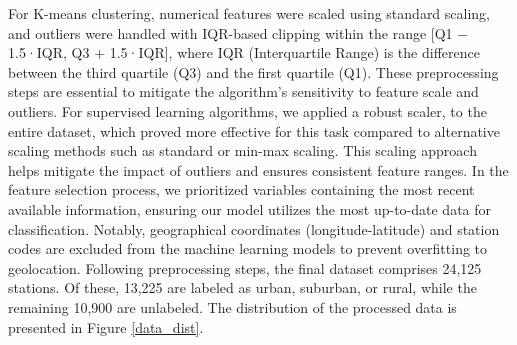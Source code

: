 \documentclass[gmd, manuscript]{copernicus}
\begin{document}
For K-means clustering, numerical features were scaled using standard scaling, and outliers were handled with IQR-based clipping within the range [Q1 − 1.5·IQR, Q3 + 1.5·IQR], where IQR (Interquartile Range) is the difference between the third quartile (Q3) and the first quartile (Q1). These preprocessing steps are essential to mitigate the algorithm’s sensitivity to feature scale and outliers. For supervised learning algorithms, we applied a robust scaler, \cite{pedregosa2011scikit} to the entire dataset, which proved more effective for this task compared to alternative scaling methods such as standard or min-max scaling. This scaling approach helps mitigate the impact of outliers and ensures consistent feature ranges. In the feature selection process, we prioritized variables containing the most recent available information, ensuring our model utilizes the most up-to-date data for classification.
Notably, geographical coordinates (longitude-latitude) and station codes are excluded from the machine learning models to prevent overfitting to geolocation.
Following preprocessing steps,  the final dataset comprises 24,125 stations. Of these, 13,225 are labeled as urban, suburban, or rural, while the remaining 10,900 are unlabeled. The distribution of the processed data is presented in Figure \ref{data_dist}. 
\end{document}

